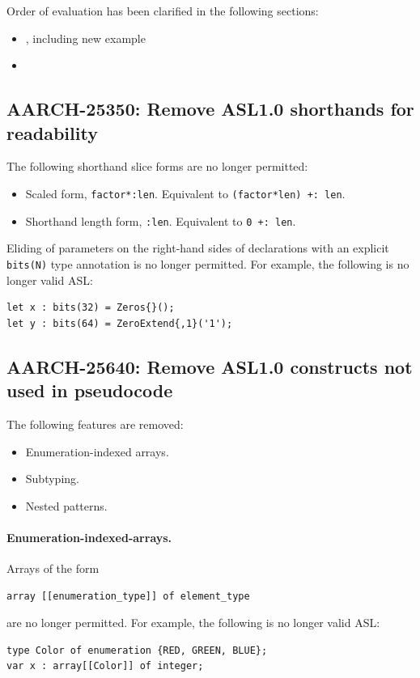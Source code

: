 Order of evaluation has been clarified in the following sections:
\begin{itemize}
  \item {}, including new example 
  \item {}
\end{itemize}

\subsection*{AARCH-25350: Remove ASL1.0 shorthands for readability}

The following shorthand slice forms are no longer permitted:
\begin{itemize}
  \item Scaled form, \lstinline{factor*:len}. Equivalent to \lstinline{(factor*len) +: len}.
  \item Shorthand length form, \lstinline{:len}. Equivalent to \lstinline{0 +: len}.
\end{itemize}

Eliding of parameters on the right-hand sides of declarations with an explicit \lstinline{bits(N)} type annotation is no longer permitted.
For example, the following is no longer valid ASL:
\begin{lstlisting}
let x : bits(32) = Zeros{}();
let y : bits(64) = ZeroExtend{,1}('1');
\end{lstlisting}

\subsection*{AARCH-25640: Remove ASL1.0 constructs not used in pseudocode}

The following features are removed:
\begin{itemize}
  \item Enumeration-indexed arrays.
  \item Subtyping.
  \item Nested patterns.
\end{itemize}

\paragraph{Enumeration-indexed-arrays.}

Arrays of the form
\begin{lstlisting}
array [[enumeration_type]] of element_type
\end{lstlisting}
are no longer permitted.
For example, the following is no longer valid ASL:
\begin{lstlisting}
type Color of enumeration {RED, GREEN, BLUE};
var x : array[[Color]] of integer;
\end{lstlisting}

